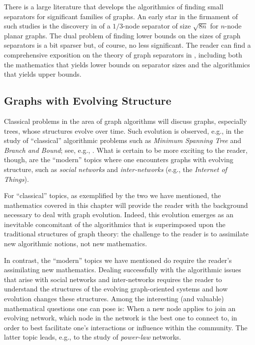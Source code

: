 \medskip

There is a large literature that develops the algorithmics of finding
small separators for significant families of graphs.  An early star in
the firmament of such studies is the discovery in \cite{LiptonT79} of
a $1/3$-node separator of size $\sqrt{8n}$ for $n$-node planar graphs.
The dual problem of finding lower bounds on the sizes of graph
separators is a bit sparser but, of course, no less significant.  The
reader can find a comprehensive exposition on the theory of graph
separators in \cite{RosenbergH01}, including both the mathematics that
yields lower bounds on separator sizes and the algorithmics that
yields upper bounds.


\subsection{Graphs with Evolving Structure}
\label{sec:graph-evolve}

Classical problems in the area of graph algorithms will discuss
graphs, especially trees, whose structures evolve over time.  Such
evolution is observed, e.g., in the study of ``classical'' algorithmic
problems such as {\it Minimum Spanning Tree} and {\it Branch and
  Bound}; see, e.g., \cite{CLRS}.  What is certain to be more exciting
to the reader, though, are the ``modern'' topics where one encounters
graphs with evolving structure, such as {\it social networks} and {\it
  inter-networks} (e.g., the {\it Internet of Things}).

For ``classical'' topics, as exemplified by the two we have mentioned,
the mathematics covered in this chapter will provide the reader with
the background necessary to deal with graph evolution.  Indeed, this
evolution emerges as an inevitable concomitant of the algorithmics
that is superimposed upon the traditional structures of graph theory:
the challenge to the reader is to assimilate new algorithmic notions,
not new mathematics.

In contrast, the ``modern'' topics we have mentioned do require the
reader's assimilating new mathematics.  Dealing successfully with the
algorithmic issues that arise with social networks and inter-networks
requires the reader to understand the structures of the evolving
graph-oriented systems and how evolution changes these structures.
Among the interesting (and valuable) mathematical questions one can
pose is: When a new node applies to join an evolving network, which
node in the network is the best one to connect to, in order to best
facilitate one's interactions or influence within the community.  The
latter topic leads, e.g., to the study of {\em power-law} networks.
\bigskip

